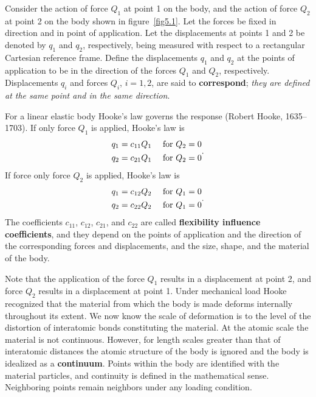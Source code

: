 \documentclass{AeroStructure-ERJohnson}
\begin{document}
 Consider the action of force $Q_{1}$ at point 1 on the body, and the action of force $Q_{2}$ at point 2 on the body shown in figure~\ref{fig5.1}. Let the forces be fixed in direction and in point of application. Let the displacements at points 1 and 2 be denoted by $q_{1}$ and $q_{2}$, respectively, being measured with respect to a rectangular Cartesian reference frame. Define the displacements $q_{1}$ and $q_{2}$ at the points of application to be in the direction of the forces $Q_{1}$ and $Q_{2}$, respectively. Displacements $q_{i}$ and forces $Q_{i}$, $i=1,2$, are said to \textbf{correspond}; \textit{they are defined at the same point and in the same direction}.

For a linear elastic body Hooke's law governs the response (Robert Hooke, 1635–1703). If only force $Q_1$ is applied, Hooke's law is
\begin{gather}\label{eq5.1}
\begin{array}{@{}ll@{}}
q_{1}=c_{11} Q_{1} & \text { for } Q_{2}=0 \\[4pt]
q_{2}=c_{21} Q_{1} & \text { for } Q_{2}=0
\end{array}.
\end{gather}
If force only force $Q_2$ is applied, Hooke's law is\vspace*{-4pt}
\begin{gather}\label{eq5.2}
\begin{array}{@{}ll@{}}
q_{1}=c_{12} Q_{2} & \text { for } Q_{1}=0 \\[4pt]
q_{2}=c_{22} Q_{2} & \text { for } Q_{1}=0
\end{array}.
\end{gather}
The coefficients $c_{11}$, $c_{12}$, $c_{21}$, and $c_{22}$ are called \textbf{flexibility influence coefficients}, and they depend on the points of application and the direction of the corresponding forces and displacements, and the size, shape, and the material of the body.

Note that\enlargethispage{0.6\baselineskip} the application of the force $Q_1$ results in a displacement at point 2, and force $Q_2$ results in a displacement at point 1. Under mechanical load Hooke recognized that the material from which the body is made deforms internally throughout its extent. We now know the scale of deformation is to the level of the distortion of interatomic bonds constituting the material. At the atomic scale the material is not continuous. However, for length scales greater than that of interatomic distances the atomic structure of the body is ignored and the body is idealized as a \textbf{continuum}. Points within the body are identified with the material particles, and continuity is defined in the mathematical sense. Neighboring points remain neighbors under any loading condition.
\end{document}
